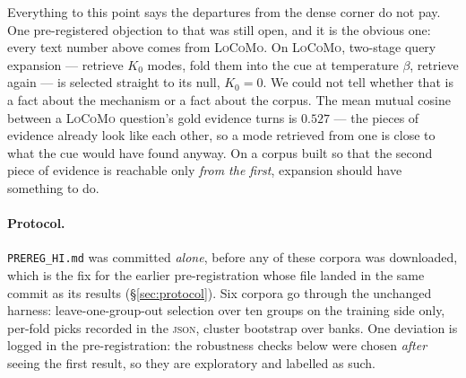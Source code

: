 Everything to this point says the departures from the dense corner do not pay. One
pre-registered objection to that was still open, and it is the obvious one: every text
number above comes from \textsc{LoCoMo}. On \textsc{LoCoMo}, two-stage query expansion ---
retrieve $K_0$ modes, fold them into the cue at temperature $\beta$, retrieve again --- is
selected straight to its null, $K_0{=}0$. We could not tell whether that is a fact about the
mechanism or a fact about the corpus. The mean mutual cosine between a \textsc{LoCoMo}
question's gold evidence turns is $0.527$ --- the pieces of evidence already look like each
other, so a mode retrieved from one is close to what the cue would have found anyway. On a
corpus built so that the second piece of evidence is reachable only \emph{from the first},
expansion should have something to do.

\paragraph{Protocol.} \texttt{PREREG\_HI.md} was committed \emph{alone}, before any of these
corpora was downloaded, which is the fix for the earlier pre-registration whose file landed
in the same commit as its results (\S\ref{sec:protocol}). Six corpora go through the
unchanged harness: leave-one-group-out selection over ten groups on the training side only,
per-fold picks recorded in the \textsc{json}, cluster bootstrap over banks. One deviation is
logged in the pre-registration: the robustness checks below were chosen \emph{after} seeing
the first result, so they are exploratory and labelled as such.

\begin{table}[t]\centering\small
\caption{Two-stage expansion across six corpora, stratified by question shape. Metric is
gold@10. The \textbf{Null} column is the number of folds in which selection chose
$K_0{=}0$, i.e.\ declined to expand: where it reads $10/10$ the $+0.000$ is the method
refusing to act, not a measurement that came out at zero, and no interval can be placed on
it. $^{*}$ marks an interval excluding zero. The pattern is not about corpus and not about
target count --- it is about whether the next piece of evidence is reachable from the
retrieved evidence (``chain'') or only from the question. RRF's column is given for scale
and is discussed below.}
\label{tab:corpora}

\end{table}

